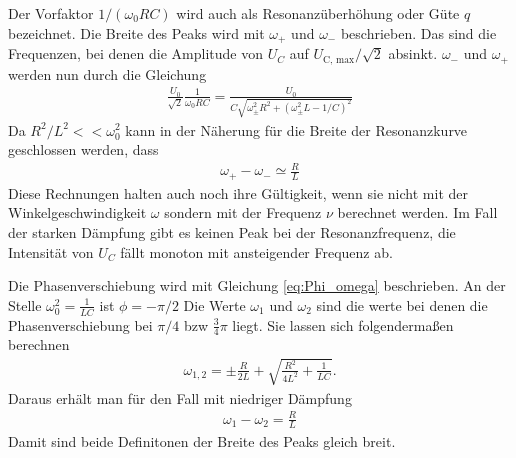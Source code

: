 Der Vorfaktor $1/(\omega_0 RC)$ wird auch als Resonanzüberhöhung oder Güte $q$ bezeichnet.
Die Breite des Peaks wird mit $\omega_+$ und $\omega_-$ beschrieben.
Das sind die Frequenzen, bei denen die Amplitude von $U_C$ auf $U_\text{C, max}/\sqrt{2}$ absinkt.
$\omega_-$ und $\omega_+$ werden nun durch die Gleichung
\begin{align*}
    \frac{U_0}{\sqrt{2}} \frac{1}{\omega_0 RC} = \frac{U_0}{C\sqrt{\omega_\pm^2 R^2 + \left(\omega_\pm^2 L - 1/C\right)^2}}
\end{align*}
Da $R^2/ L^2 << \omega_0^2$ kann in der Näherung für die Breite der Resonanzkurve geschlossen werden, dass
\begin{align}
    \omega_+ - \omega_- \simeq \frac{R}{L}
    \label{eq:omega_Breite_pm}
\end{align}
Diese Rechnungen halten auch noch ihre Gültigkeit, 
wenn sie nicht mit der Winkelgeschwindigkeit $\omega$ sondern mit der Frequenz $\nu$ berechnet werden.
Im Fall der starken Dämpfung gibt es keinen Peak bei der Resonanzfrequenz, 
die Intensität von $U_C$ fällt monoton mit ansteigender Frequenz ab.

Die Phasenverschiebung wird mit Gleichung \eqref{eq:Phi_omega} beschrieben.
An der Stelle $\omega_0^2 = \frac{1}{LC}$ ist $\phi = -\pi/2$
Die Werte $\omega_1$ und $\omega_2$ sind die werte bei denen die Phasenverschiebung bei $\pi/4$ bzw $\frac{3}{4}\pi$ liegt.
Sie lassen sich folgendermaßen berechnen
\begin{align}
    \omega_{1,2} = \pm \frac{R}{2L} + \sqrt{\frac{R^2}{4L^2} + \frac{1}{LC}}.
    \label{eq:omega12}
\end{align}
Daraus erhält man für den Fall mit niedriger Dämpfung
\begin{align}
    \omega_1 -\omega_2 = \frac{R}{L}
    \label{eq:omega_Breite_12}
\end{align}
Damit sind beide Definitonen der Breite des Peaks gleich breit.